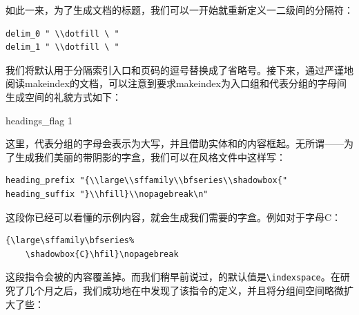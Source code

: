 如此一来，为了生成文档的标题，我们可以一开始就重新定义一二级间的分隔符：

\begin{dmd}
\begin{verbatim}
delim_0 " \\dotfill \ "
delim_1 " \\dotfill \ "\end{verbatim}
\end{dmd}

我们将默认用于分隔索引入口和页码的逗号替换成了省略号。接下来，通过严谨地阅读\textsf{makeindex}的文档，可以注意到要求\textsf{makeindex}为入口组和代表分组的字母间生成空间的礼貌方式如下：

\begin{dmd}
headings\_flag 1
\end{dmd}

这里，代表分组的字母会表示为大写，并且借助实体和的内容框起。无所谓——为了生成我们美丽的带阴影的字盒，我们可以在风格文件中这样写：

\begin{dmd}
\begin{verbatim}
heading_prefix "{\\large\\sffamily\\bfseries\\shadowbox{"
heading_suffix "}\\hfill}\\nopagebreak\n"\end{verbatim}
\end{dmd}

这段你已经可以看懂的示例内容，就会生成我们需要的字盒。例如对于字母C：

\begin{codelist}[10.1]{
    {\large\sffamily\bfseries%
    \hfil}\nopagebreak
}
\begin{verbatim}
{\large\sffamily\bfseries%
    \shadowbox{C}\hfil}\nopagebreak\end{verbatim}
\end{codelist}

这段指令会被的内容覆盖掉。而我们稍早前说过，的默认值是\verb|\indexspace|。在研究了几个月之后，我们成功地在中发现了该指令的定义，并且将分组间空间略微扩大了些：

\begin{dmd}
\renewcommand\indexspace{%
    \par \vskip 20pt plus5pt minus3pt\relax}
\end{dmd}

